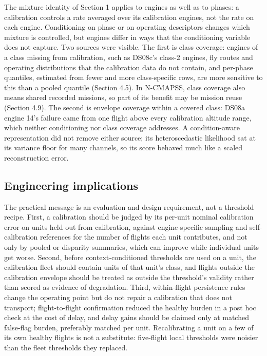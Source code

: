 \documentclass[preprint,11pt,a4paper]{elsarticle}
\begin{document}
The mixture identity of Section 1 applies to engines as well as to phases: a calibration controls a rate averaged over its calibration engines, not the rate on each engine. Conditioning on phase or on operating descriptors changes which mixture is controlled, but engines differ in ways that the conditioning variable does not capture. Two sources were visible. The first is class coverage: engines of a class missing from calibration, such as DS08c's class-2 engines, fly routes and operating distributions that the calibration data do not contain, and per-phase quantiles, estimated from fewer and more class-specific rows, are more sensitive to this than a pooled quantile (Section 4.5). In N-CMAPSS, class coverage also means shared recorded missions, so part of its benefit may be mission reuse (Section 4.9). The second is envelope coverage within a covered class: DS08a engine 14's failure came from one flight above every calibration altitude range, which neither conditioning nor class coverage addresses. A condition-aware representation did not remove either source; its heteroscedastic likelihood sat at its variance floor for many channels, so its score behaved much like a scaled reconstruction error.

\subsection{Engineering implications}

The practical message is an evaluation and design requirement, not a threshold recipe. First, a calibration should be judged by its per-unit nominal calibration error on units held out from calibration, against engine-specific sampling and self-calibration references for the number of flights each unit contributes, and not only by pooled or disparity summaries, which can improve while individual units get worse. Second, before context-conditioned thresholds are used on a unit, the calibration fleet should contain units of that unit's class, and flights outside the calibration envelope should be treated as outside the threshold's validity rather than scored as evidence of degradation. Third, within-flight persistence rules change the operating point but do not repair a calibration that does not transport; flight-to-flight confirmation reduced the healthy burden in a post hoc check at the cost of delay, and delay gains should be claimed only at matched false-flag burden, preferably matched per unit. Recalibrating a unit on a few of its own healthy flights is not a substitute: five-flight local thresholds were noisier than the fleet thresholds they replaced.
\end{document}
